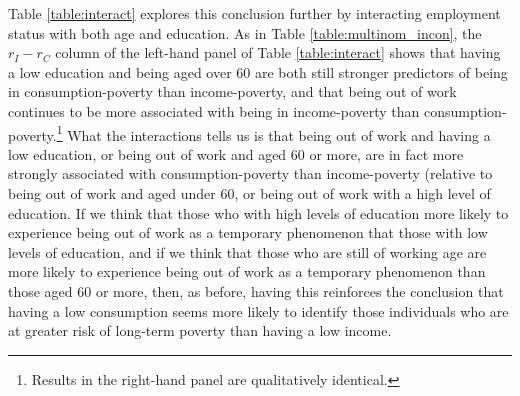
Table \ref{table:interact} explores this conclusion further by interacting employment status with both age and education. As in Table \ref{table:multinom_incon}, the $r_{I}-r_{C}$ column of the left-hand panel of Table \ref{table:interact} shows that having a low education and being aged over 60 are both still stronger predictors of being in consumption-poverty than income-poverty, and that being out of work continues to be more associated with being in income-poverty than consumption-poverty.\footnote{Results in the right-hand panel are qualitatively identical.} What the interactions tells us is that being out of work and having a low education, or being out of work and aged 60 or more, are in fact more strongly associated with consumption-poverty than income-poverty (relative to being out of work and aged under 60, or being out of work with a high level of education. If we think that those who with high levels of education more likely to experience being out of work as a temporary phenomenon that those with low levels of education, and if we think that those who are still of working age are more likely to experience being out of work as a temporary phenomenon than those aged 60 or more, then, as before, having this reinforces the conclusion that having a low consumption seems more likely to identify those individuals who are at greater risk of long-term poverty than having a low income.

